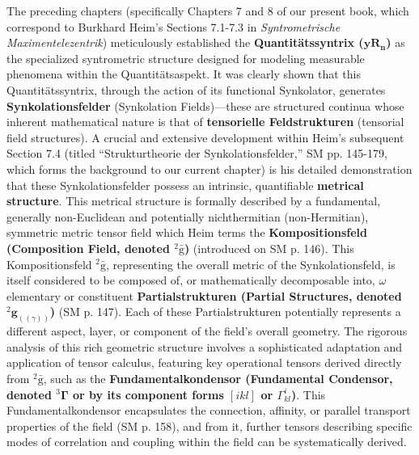 \documentclass[12pt]{article}
\newcommand{\q}[1]{\enquote{#1}}
\newcommand{\quantitaetssyntrix}{\bm{yR_n}}
\newcommand{\kompositionsfeld}{{}^2\bar{\mathrm{g}}}
\newcommand{\partialstruktur}[1]{{}^2\mathbf{g}_{(#1)}}
\newcommand{\fundamentalkondensor}{{}^3\bm{\Gamma}}
\begin{document}
The preceding chapters (specifically Chapters 7 and 8 of our present book, which correspond to Burkhard Heim's Sections 7.1-7.3 in \textit{Syntrometrische Maximentelezentrik}) meticulously established the \textbf{Quantitätssyntrix (\(\quantitaetssyntrix\))} as the specialized syntrometric structure designed for modeling measurable phenomena within the Quantitätsaspekt. It was clearly shown that this Quantitätssyntrix, through the action of its functional Synkolator, generates \textbf{Synkolationsfelder} (Synkolation Fields)—these are structured continua whose inherent mathematical nature is that of \textbf{tensorielle Feldstrukturen} (tensorial field structures). A crucial and extensive development within Heim's subsequent Section 7.4 (titled \q{Strukturtheorie der Synkolationsfelder,} SM pp. 145-179, which forms the background to our current chapter) is his detailed demonstration that these Synkolationsfelder possess an intrinsic, quantifiable \textbf{metrical structure}. This metrical structure is formally described by a fundamental, generally non-Euclidean and potentially nichthermitian (non-Hermitian), symmetric metric tensor field which Heim terms the \textbf{Kompositionsfeld (Composition Field, denoted \( \kompositionsfeld \))} (introduced on SM p. 146). This Kompositionsfeld \( \kompositionsfeld \), representing the overall metric of the Synkolationsfeld, is itself considered to be composed of, or mathematically decomposable into, \( \omega \) elementary or constituent \textbf{Partialstrukturen (Partial Structures, denoted \( \partialstruktur{(\gamma)} \))} (SM p. 147). Each of these Partialstrukturen potentially represents a different aspect, layer, or component of the field's overall geometry. The rigorous analysis of this rich geometric structure involves a sophisticated adaptation and application of tensor calculus, featuring key operational tensors derived directly from \( \kompositionsfeld \), such as the \textbf{Fundamentalkondensor (Fundamental Condensor, denoted \( \fundamentalkondensor \) or by its component forms \( [ikl] \) or \( \Gamma^i_{kl} \))}. This Fundamentalkondensor encapsulates the connection, affinity, or parallel transport properties of the field (SM p. 158), and from it, further tensors describing specific modes of correlation and coupling within the field can be systematically derived.
\end{document}
